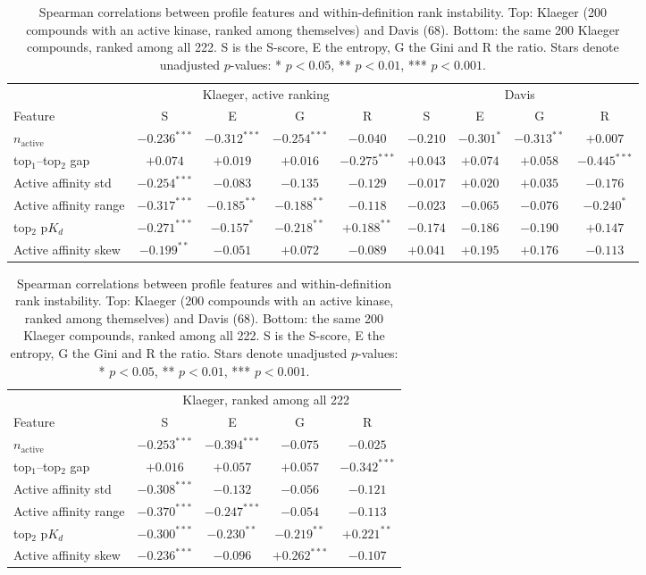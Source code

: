 \documentclass[11pt]{article}
\begin{document}
\begin{table}[h]
\centering
\caption{Spearman correlations between profile features and within-definition
rank instability. Top: Klaeger (200 compounds with an active kinase, ranked
among themselves) and Davis (68). Bottom: the same 200 Klaeger compounds,
ranked among all 222. S is the S-score, E the entropy, G the Gini and R the ratio.
Stars denote unadjusted $p$-values: * $p<0.05$,
** $p<0.01$, *** $p<0.001$.}
\footnotesize
\setlength{\tabcolsep}{2.7pt}
\begin{tabular}{lcccc@{\hskip 1.4em}cccc}
\toprule
& \multicolumn{4}{c}{Klaeger, active ranking} & \multicolumn{4}{c}{Davis} \\
Feature & S & E & G & R & S & E & G & R \\
\midrule
$n_\mathrm{active}$      & $-0.236^{***}$ & $-0.312^{***}$ & $-0.254^{***}$ & $-0.040$       & $-0.210$ & $-0.301^{*}$ & $-0.313^{**}$ & $+0.007$ \\
top$_1$--top$_2$ gap     & $+0.074$       & $+0.019$       & $+0.016$       & $-0.275^{***}$ & $+0.043$ & $+0.074$     & $+0.058$      & $-0.445^{***}$ \\
Active affinity std      & $-0.254^{***}$ & $-0.083$       & $-0.135$       & $-0.129$       & $-0.017$ & $+0.020$     & $+0.035$      & $-0.176$ \\
Active affinity range    & $-0.317^{***}$ & $-0.185^{**}$  & $-0.188^{**}$  & $-0.118$       & $-0.023$ & $-0.065$     & $-0.076$      & $-0.240^{*}$ \\
top$_2$ $\mathrm{p}K_d$  & $-0.271^{***}$ & $-0.157^{*}$   & $-0.218^{**}$  & $+0.188^{**}$  & $-0.174$ & $-0.186$     & $-0.190$      & $+0.147$ \\
Active affinity skew     & $-0.199^{**}$  & $-0.051$       & $+0.072$       & $-0.089$       & $+0.041$ & $+0.195$     & $+0.176$      & $-0.113$ \\
\bottomrule
\end{tabular}

\vspace{1em}
\begin{tabular}{lcccc}
\toprule
& \multicolumn{4}{c}{Klaeger, ranked among all 222} \\
Feature & S & E & G & R \\
\midrule
$n_\mathrm{active}$      & $-0.253^{***}$ & $-0.394^{***}$ & $-0.075$       & $-0.025$       \\
top$_1$--top$_2$ gap     & $+0.016$       & $+0.057$       & $+0.057$       & $-0.342^{***}$ \\
Active affinity std      & $-0.308^{***}$ & $-0.132$       & $-0.056$       & $-0.121$       \\
Active affinity range    & $-0.370^{***}$ & $-0.247^{***}$ & $-0.054$       & $-0.113$       \\
top$_2$ $\mathrm{p}K_d$  & $-0.300^{***}$ & $-0.230^{**}$  & $-0.219^{**}$  & $+0.221^{**}$  \\
Active affinity skew     & $-0.236^{***}$ & $-0.096$       & $+0.262^{***}$ & $-0.107$       \\
\bottomrule
\end{tabular}
\end{table}
\end{document}
